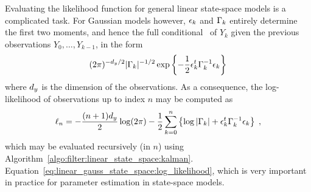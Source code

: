 \begin{rem}
  \label{rem:GLSSM:likelihhod}
  Evaluating the likelihood function for general linear state-space models is a
  complicated task. For Gaussian models however, $\epsilon_k$ and $\Gamma_k$ entirely
  determine the first two moments, and hence the full conditional
  \pdf\, of $Y_k$ given the
  previous observations $Y_0, \dots, Y_{k-1}$, in the form
  \begin{equation}
  \label{eq:conditional-density}
  (2\pi)^{-d_y/2} |\Gamma_k|^{-1/2} \exp \left\{ - \frac12 \epsilon_k^t \Gamma_k^{-1} \epsilon_k \right\}
  \end{equation}
 where $d_y$ is the dimension of the observations. As a consequence, the log-likelihood of observations up to index $n$ may be computed as 
\begin{equation}
  \label{eq:linear_gauss_state_space:log_likelihood}
  \logl{n} = -\frac{(n+1)\dimy}{2} \log(2 \pi) - \frac{1}{2} \sum_{k=0}^n \left\{ \log \left|\ICov_k\right| + \I_k^t \ICov_k^{-1} \I_k \right\} \eqsp ,
\end{equation}
which may be evaluated recursively (in $n$) using
Algorithm~\ref{algo:filter:linear_state_space:kalman}.
Equation~\eqref{eq:linear_gauss_state_space:log_likelihood}, which is very important in
practice for parameter estimation in state-space models.
\end{rem}

